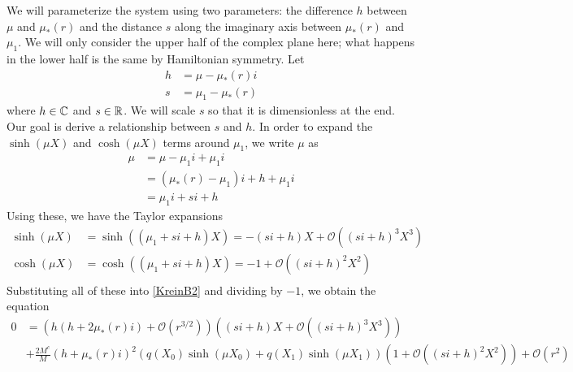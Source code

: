 \documentclass[thesis.tex]{subfiles}
\begin{document}
We will parameterize the system using two parameters: the difference $h$ between $\mu$ and $\mu_*(r)$ and the distance $s$ along the imaginary axis between $\mu_*(r)$ and $\mu_1$. We will only consider the upper half of the complex plane here; what happens in the lower half is the same by Hamiltonian symmetry. Let 
\begin{align*}
h &= \mu - \mu_*(r) i \\
s &= \mu_1 - \mu_*(r)
\end{align*}
where $h \in \mathbb{C}$ and $s \in \mathbb{R}$. We will scale $s$ so that it is dimensionless at the end. Our goal is derive a relationship between $s$ and $h$. In order to expand the $\sinh(\mu X)$ and $\cosh(\mu X)$ terms around $\mu_1$, we write $\mu$ as
\begin{align*}
\mu &= \mu - \mu_1 i + \mu_1 i \\
&= (\mu_*(r) - \mu_1)i + h + \mu_1 i \\
&= \mu_1 i + s i + h
\end{align*}
Using these, we have the Taylor expansions
\begin{align*}
\sinh(\mu X) &= \sinh((\mu_1 + s i + h)X)
= -(s i + h)X + \mathcal{O}\left( (s i +h)^3 X^3 \right) \\
\cosh(\mu X) &= \cosh((\mu_1 + s i + h)X)
= -1 + \mathcal{O}\left( (s i + h)^2 X^2 \right) \\
\end{align*}
Substituting all of these into \cref{KreinB2} and dividing by $-1$, we obtain the equation
\begin{equation}\label{KreinB3}
\begin{aligned}
0 &= \left( h ( h + 2 \mu_*(r) i) +  \mathcal{O}( r^{3/2} )\right) \left( (s i + h)X + \mathcal{O}\left( (si+h)^3 X^3 \right)  \right) \\
&+\frac{2 M^c}{M} ( h + \mu_*(r) i)^2 ( q(X_0)\sinh(\mu X_0) + q(X_1) \sinh(\mu X_1) ) \left( 1 + \mathcal{O}\left( (s i +h)^2 X^2 \right) \right) + \mathcal{O}( r^2 ) 
\end{aligned}
\end{equation}
\end{document}

